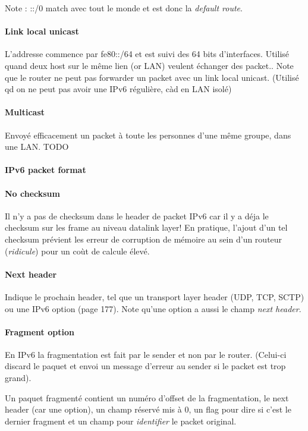 Note : ::/0 match avec tout le monde et est donc la \textit{default route}.

\paragraph{Link local unicast}
L'addresse commence par fe80::/64 et est suivi des 64 bits d'interfaces.
Utilisé quand deux host sur le même lien (or LAN) veulent échanger des
packet.. Note que le router ne peut pas forwarder un packet avec un
link local unicast.
(Utilisé qd on ne peut pas avoir une IPv6 régulière, càd en LAN isolé)


\paragraph{Multicast}
Envoyé efficacement un packet à toute les personnes d'une même groupe, dans une LAN.
TODO

\paragraph{IPv6 packet format}

\paragraph{No checksum}
Il n'y a pas de checksum dans le header de packet IPv6 car il y a déja le checksum
sur les frame au niveau datalink layer! En pratique, l'ajout d'un tel checksum prévient
les erreur de corruption de mémoire au sein d'un routeur (\textit{ridicule}) pour un coùt de
calcule élevé.

\paragraph{Next header}
Indique le prochain header, tel que un transport layer header (UDP, TCP, SCTP) ou une
IPv6 option (page 177). Note qu'une option a aussi le champ \textit{next header}.

\paragraph{Fragment option}
En IPv6 la fragmentation est fait par le sender et non par le router. (Celui-ci discard
le paquet et envoi un message d'erreur au sender si le packet est trop grand).

Un paquet fragmenté contient un numéro d'offset de la fragmentation, le next header (car une option), un champ réservé mis à 0, un flag pour dire si c'est le dernier fragment et un
champ pour \textit{identifier} le packet original.

